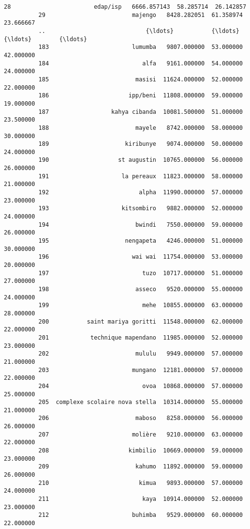 \documentclass[11pt]{article}
\begin{document}
\begin{Verbatim}[commandchars=\\\{\}]
          28                        edap/isp   6666.857143  58.285714  26.142857   
          29                         majengo   8428.282051  61.358974  23.666667   
          ..                             {\ldots}           {\ldots}        {\ldots}        {\ldots}   
          183                        lumumba   9807.000000  53.000000  42.000000   
          184                           alfa   9161.000000  54.000000  24.000000   
          185                         masisi  11624.000000  52.000000  22.000000   
          186                       ipp/beni  11808.000000  59.000000  19.000000   
          187                  kahya cibanda  10081.500000  51.000000  23.500000   
          188                         mayele   8742.000000  58.000000  30.000000   
          189                      kiribunye   9074.000000  50.000000  24.000000   
          190                    st augustin  10765.000000  56.000000  26.000000   
          191                     la pereaux  11823.000000  58.000000  21.000000   
          192                          alpha  11990.000000  57.000000  23.000000   
          193                     kitsombiro   9882.000000  52.000000  24.000000   
          194                         bwindi   7550.000000  59.000000  26.000000   
          195                      nengapeta   4246.000000  51.000000  30.000000   
          196                        wai wai  11754.000000  53.000000  20.000000   
          197                           tuzo  10717.000000  51.000000  27.000000   
          198                         asseco   9520.000000  55.000000  24.000000   
          199                           mehe  10855.000000  63.000000  28.000000   
          200           saint mariya goritti  11548.000000  62.000000  22.000000   
          201            technique mapendano  11985.000000  52.000000  23.000000   
          202                         mululu   9949.000000  57.000000  21.000000   
          203                        mungano  12181.000000  57.000000  22.000000   
          204                           ovoa  10868.000000  57.000000  25.000000   
          205  complexe scolaire nova stella  10314.000000  55.000000  21.000000   
          206                         maboso   8258.000000  56.000000  26.000000   
          207                        molière   9210.000000  63.000000  22.000000   
          208                       kimbilio  10669.000000  59.000000  23.000000   
          209                         kahumo  11892.000000  59.000000  26.000000   
          210                          kimua   9893.000000  57.000000  24.000000   
          211                           kaya  10914.000000  52.000000  23.000000   
          212                        buhimba   9529.000000  60.000000  22.000000   
          

\end{Verbatim}
\end{document}
